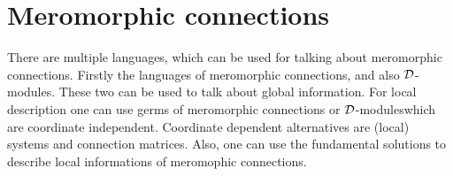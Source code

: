 \chapter{Meromorphic connections}
\begin{comment}
  \begin{multicols}{2}
    \textbf{Global}
    \begin{itemize}
      \item Meromorphic connection
      \item $\cD$-modules (global)
    \end{itemize}
    \columnbreak
    \textbf{Local}
    \begin{itemize}
      \item Germ of a meromophic connection
      \item $\cD$-modules (local)
      \item System
        \begin{itemize}
          \item coordinate dependent
        \end{itemize}
      \item Conection matrix
        \begin{itemize}
          \item coordinate dependent
        \end{itemize}
    \end{itemize}
  \end{multicols}
\end{comment}
There are multiple languages, which can be used for talking about meromorphic
connections. Firstly the languages of meromorphic connections, and also
$\mathcal{D}$-modules\TODO[global]. These two can be used to talk about global
information. For local description one can use germs of meromorphic connections
or $\mathcal{D}$-modules\TODO[local] which are coordinate independent. Coordinate
dependent alternatives are (local) systems and connection matrices. Also, one
can use the fundamental solutions to describe local informations of meromophic
connections.
\begin{comment}
  Siehe:
  \begin{multicols}{3}
    \begin{itemize}
      \item \cite{boalch} and \cite{thboalch}
      \item \cite{sabbah2007isomonodromic}
    \end{itemize}
    \columnbreak
    \begin{itemize}
      \item \cite{Varadarajan96linearmeromorphic}
    \end{itemize}
    \columnbreak
    \begin{itemize}
      \item \cite{Loday1994}
      \item \cite{Loday2014}
    \end{itemize}
  \end{multicols}
\end{comment}

